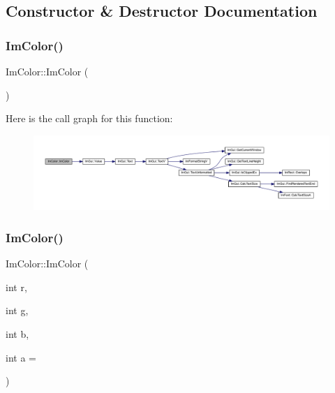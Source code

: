 \subsection{Constructor \& Destructor Documentation}
\mbox{\label{struct_im_color_a95206b688dcc03f725790538c74f4526}} 
\subsubsection{\texorpdfstring{Im\+Color()}{ImColor()}\hspace{0.1cm}{\footnotesize\ttfamily [1/5]}}
{\footnotesize\ttfamily Im\+Color\+::\+Im\+Color (\begin{DoxyParamCaption}{ }\end{DoxyParamCaption})\hspace{0.3cm}{\ttfamily [inline]}}

Here is the call graph for this function\+:
\nopagebreak
\begin{figure}[H]
\begin{center}
\leavevmode
\includegraphics[width=350pt]{struct_im_color_a95206b688dcc03f725790538c74f4526_cgraph}
\end{center}
\end{figure}
\mbox{\label{struct_im_color_ab4ba02f8290d5dadc1ebc57b2c8a9cbe}} 
\subsubsection{\texorpdfstring{Im\+Color()}{ImColor()}\hspace{0.1cm}{\footnotesize\ttfamily [2/5]}}
{\footnotesize\ttfamily Im\+Color\+::\+Im\+Color (\begin{DoxyParamCaption}\item[{int}]{r,  }\item[{int}]{g,  }\item[{int}]{b,  }\item[{int}]{a = {} }\end{DoxyParamCaption})\hspace{0.3cm}{\ttfamily [inline]}}

